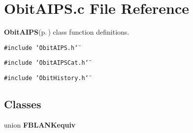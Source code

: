 \section{Obit\-AIPS.c File Reference}
\label{ObitAIPS_8c}
{\bf Obit\-AIPS}{\rm (p.\,\pageref{structObitAIPS})} class function definitions. 

{\tt \#include \char`\"{}Obit\-AIPS.h\char`\"{}}\par
{\tt \#include \char`\"{}Obit\-AIPSCat.h\char`\"{}}\par
{\tt \#include \char`\"{}Obit\-History.h\char`\"{}}\par
\subsection*{Classes}
\begin{CompactItemize}
\item 
union {\bf FBLANKequiv}
\end{CompactItemize}
